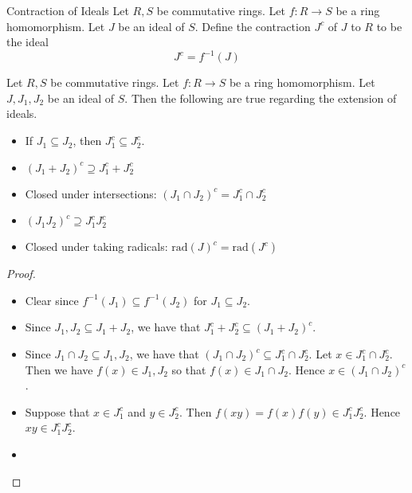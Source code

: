 \documentclass[a4paper]{article}
\begin{document}
\begin{defn}{Contraction of Ideals}{} Let $R,S$ be commutative rings. Let $f:R\to S$ be a ring homomorphism. Let $J$ be an ideal of $S$. Define the contraction $J^c$ of $J$ to $R$ to be the ideal $$J^c=f^{-1}(J)$$
\end{defn}

\begin{prp}{}{} Let $R,S$ be commutative rings. Let $f:R\to S$ be a ring homomorphism. Let $J,J_1,J_2$ be an ideal of $S$. Then the following are true regarding the extension of ideals. 
\begin{itemize}
\item If $J_1\subseteq J_2$, then $J_1^c\subseteq J_2^c$. 
\item $(J_1+J_2)^c\supseteq J_1^c+J_2^c$
\item Closed under intersections: $(J_1\cap J_2)^c=J_1^c\cap J_2^c$
\item $(J_1J_2)^c\supseteq J_1^cJ_2^c$
\item Closed under taking radicals: $\text{rad}(J)^c=\text{rad}(J^c)$
\end{itemize} \tcbline
\begin{proof}~\\
\begin{itemize}
\item Clear since $f^{-1}(J_1)\subseteq f^{-1}(J_2)$ for $J_1\subseteq J_2$. 
\item Since $J_1,J_2\subseteq J_1+J_2$, we have that $J_1^c+J_2^c\subseteq(J_1+J_2)^c$. 
\item Since $J_1\cap J_2\subseteq J_1,J_2$, we have that $(J_1\cap J_2)^c\subseteq J_1^c\cap J_2^c$. Let $x\in J_1^c\cap J_2^c$. Then we have $f(x)\in J_1,J_2$ so that $f(x)\in J_1\cap J_2$. Hence $x\in(J_1\cap J_2)^c$. 
\item Suppose that $x\in J_1^c$ and $y\in J_2^c$. Then $f(xy)=f(x)f(y)\in J_1^cJ_2^c$. Hence $xy\in J_1^cJ_2^c$. 
\item 
\end{itemize}
\end{proof}
\end{prp}
\end{document}
